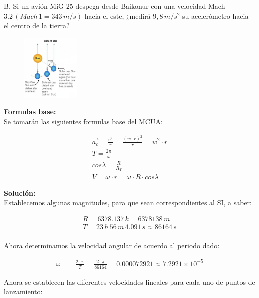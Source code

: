 \documentclass[11pt,letterpaper]{article}
\begin{document}
B. Si un avión MiG-25 despega desde Baikonur con una velocidad Mach $3.2\,(Mach\,1 = 343\,m/s)$ hacia el este, ¿medirá $9,8\,m/s^2$ su acelerómetro hacia el centro de la tierra?\\

\begin{figure}
\begin{center}
\includegraphics[width=0.25\textwidth]{problema_7.png}
\end{center}
\end{figure}

\textbf{Formulas base:}\\

Se tomarán las siguientes formulas base del MCUA:

\begin{align}
\boxed{ \vec{a_{c}} = \frac{v^2}{r} = \frac{(w \cdot r)^2}{r} = w^2 \cdot r}\\
\boxed{ T = \frac{2\pi}{\omega}}\\
\boxed{ cos \lambda = \frac{R}{R_{T}}}\\
\boxed{ V = \omega \cdot r = \omega \cdot R \cdot cos \lambda}
\end{align}

\textbf{Solución:}\\

Establecemos algunas magnitudes, para que sean correspondientes al SI, a saber:

\begin{align*}
R = 6378.137\,k = 6378138\,m\\
T = 23\,h\,56\,m\,4.091\,s \approx 86164\,s\\
\end{align*}

Ahora determinamos la velocidad angular de acuerdo al periodo dado:

\begin{align}
\omega &= \frac{2 \cdot \pi}{T} = \frac{2 \cdot \pi}{86164} = 0.000072921 \approx 7.2921 \times 10^{-5} 
\end{align}

Ahora se establecen las diferentes velocidades lineales para cada uno de puntos de lanzamiento:
\end{document}
